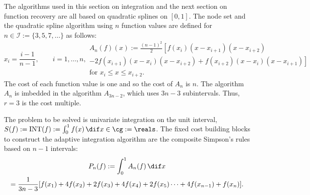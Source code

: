 \documentclass[]{elsarticle}
\DeclareMathOperator{\INT}{INT}
\theoremstyle{definition}
\theoremstyle{remark}
\begin{document}
The algorithms used in this section on integration and the next section on function recovery are all based on quadratic splines on $[0,1]$.  The node set and the quadratic spline algorithm using $n$ function values are defined for $n \in \mathcal{I}:=\{3,5,7, \ldots\}$ as follows:
\begin{subequations} \label{linearspline}
\begin{equation}
x_i=\frac{i-1}{n-1}, \qquad i=1, \ldots, n,
\end{equation}
\begin{multline}
A_{n}(f)(x):=\frac{(n-1)^2}{2} \left[ f(x_{i})(x-x_{i+1})(x-x_{i+2})\right. \\\left.- 2f(x_{i+1})(x-x_{i})(x-x_{i+2}) +f(x_{i+2})(x-x_i)(x-x_{i+1}) \right] \\ \text{for }x_i \leq x \leq x_{i+2}.
\end{multline}
\end{subequations}
The cost of each function value is one and so the cost of  $A_n$ is $n$. The algorithm $A_n$ is imbedded in the algorithm $A_{3n-2}$, which uses $3n-3$ subintervals.  Thus, $r=3$ is the cost multiple.

The problem to be solved is univariate integration on the unit interval, $S(f):=\INT(f):=\int_{0}^{1}f(x) \, \dif x \in \cg := \reals$.  The fixed cost building blocks to construct the adaptive integration algorithm are the composite Simpson's rules based on $n-1$ intervals:
\begin{multline}
    P_{n}(f) := \int_0^1 A_n(f) \, \dif x \\
    =\frac{1}{3n-3}[f(x_1)+4f(x_2)+2f(x_3)+4f(x_4)+2f(x_5)\cdots+4f(x_{n-1})+f(x_n)].
\end{multline}
\end{document}
